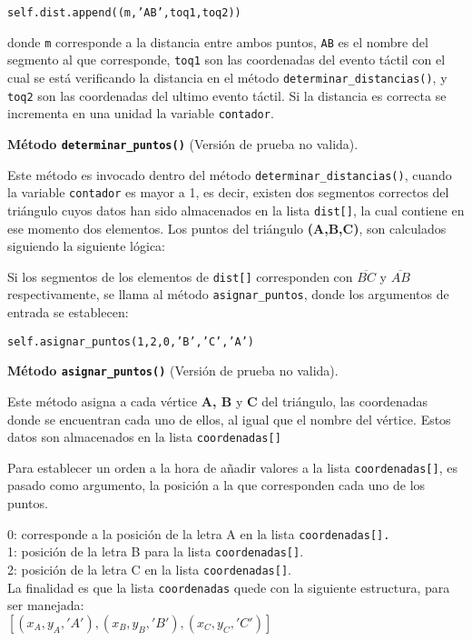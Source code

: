 \texttt{self.dist.append((m,'AB',toq1,toq2)) }

donde \texttt{m} corresponde a la distancia entre ambos puntos, \texttt{AB} es el nombre del segmento al que corresponde, \texttt{toq1} son las coordenadas del evento táctil con el cual se está verificando la distancia en el método \texttt{determinar\_distancias()}, y \texttt{toq2} son las coordenadas del ultimo evento táctil.
Si la distancia es correcta se incrementa en una unidad la variable \texttt{contador}.

\textbf{Método \texttt{determinar\_puntos()}} (Versión de prueba no valida).

Este método es invocado dentro del método \texttt{determinar\_distancias()}, cuando la variable \texttt{contador} es mayor a 1, es decir, existen dos segmentos correctos del triángulo cuyos datos han sido almacenados en la lista \texttt{dist[]}, la cual contiene en ese momento dos elementos.
Los puntos del triángulo \textbf{(A,B,C)}, son calculados siguiendo la siguiente lógica:

Si los segmentos de los elementos de \texttt{dist[]} corresponden con $\overline{BC}$ y $\overline{AB}$ respectivamente, se llama al método \texttt{asignar\_puntos}, donde los argumentos de entrada se establecen:

\texttt{self.asignar\_puntos(1,2,0,'B','C','A')}

\textbf{Método \texttt{asignar\_puntos()}} (Versión de prueba no valida).

Este método asigna a cada vértice \textbf{A, B} y \textbf{C} del triángulo, las coordenadas donde se encuentran cada uno de ellos, al igual que el nombre del vértice. Estos datos son almacenados en la lista \texttt{coordenadas[]}

Para establecer un orden a la hora de añadir valores a la lista \texttt{coordenadas[]}, es pasado como argumento, la posición a la que corresponden cada uno de los puntos.

0: corresponde a la posición de la letra A en la lista \texttt{coordenadas[].}\\
1: posición de la letra B para la lista \texttt{coordenadas[]}.\\
2: posición de la letra C en la lista \texttt{coordenadas[]}.\\

La finalidad es que la lista \texttt{coordenadas} quede con la siguiente estructura, para ser manejada:\\

$[(x_{A},y_{A},'A'),(x_{B},y_{B},'B'),(x_{C},y_{C},'C')]$\\

